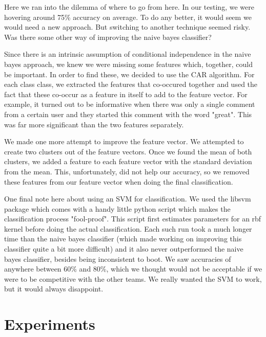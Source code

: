 \documentclass[]{report}
\begin{document}
Here we ran into the dilemma of where to go from here.  In our testing, we were hovering around 75\% accuracy on average.  To do any better, it would seem we would need a new approach.  But switching to another technique seemed risky.  Was there some other way of improving the naive bayes classifier?

Since there is an intrinsic assumption of conditional independence in the naive bayes approach, we knew we were missing some features which, together, could be important.  In order to find these, we decided to use the CAR algorithm.  For each class class, we extracted the features that co-occured together and used the fact that these co-occur as a feature in itself to add to the feature vector.  For example, it turned out to be informative when there was only a single comment from a certain user and they started this comment with the word "great".  This was far more significant than the two features separately.

We made one more attempt to improve the feature vector.  We attempted to create two clusters out of the feature vectors.  Once we found the mean of both clusters, we added a feature to each feature vector with the standard deviation from the mean.  This, unfortunately, did not help our accuracy, so we removed these features from our feature vector when doing the final classification.

One final note here about using an SVM for classification.  We used the libsvm package which comes with a handy little python script which makes the classification process "fool-proof".  This script first estimates parameters for an rbf kernel before doing the actual classification.  Each such run took a much longer time than the naive bayes classifier (which made working on improving this classifier quite a bit more difficult) and it also never outperformed the naive bayes classifier, besides being inconsistent to boot.  We saw accuracies of anywhere between 60\% and 80\%, which we thought would not be acceptable if we were to be competitive with the other teams.  We really wanted the SVM to work, but it would always disappoint.

\section{Experiments}
\end{document}
